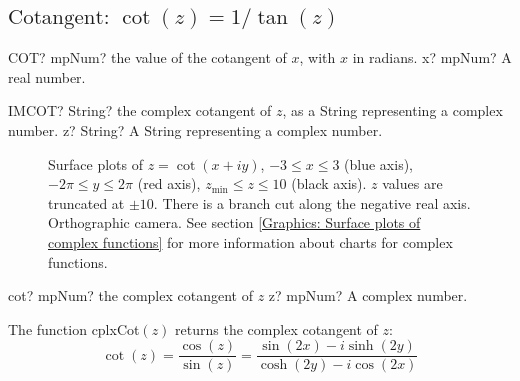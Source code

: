\newpage
\subsection{\texorpdfstring{$\text{Cotangent: }\cot(z) = 1/\tan(z)$}{cot}}

\begin{mpFunctionsExtract}
	\mpWorksheetFunctionOneNotImplemented
	{COT? mpNum? the value of the cotangent of $x$, with $x$ in radians.}
	{x? mpNum? A real number.}
\end{mpFunctionsExtract}

\vspace{0.6cm}
\begin{mpFunctionsExtract}
	\mpWorksheetFunctionOneNotImplemented
	{IMCOT? String? the complex cotangent of $z$, as a String representing a complex number.}
	{z? String? A String representing a complex number.}
\end{mpFunctionsExtract}


\begin{figure}[ht]%
	\centering
	\qquad
	\caption[Complex Cotangent]{Surface plots of $z = \cot(x + iy)$, $-3 \leq x \leq 3$ (blue axis), $-2 \pi \leq y \leq 2\pi$ (red axis), $z_{\text{min}} \leq z \leq 10$ (black axis). $z$ values are truncated at $\pm 10$. There is a branch cut along the negative real axis. Orthographic camera. See section \ref{Graphics: Surface plots of complex functions} for more information about charts for complex functions.} 
	\label{fig:Complex Cotangent}%
\end{figure}

\begin{mpFunctionsExtract}
	\mpFunctionOne
	{cot? mpNum? the complex cotangent of $z$}
	{z? mpNum? A complex number.}
\end{mpFunctionsExtract}

\vspace{0.3cm}
The function \textsf{cplxCot$(z)$} returns the complex cotangent of $z$: 
\begin{equation}
	\cot(z) =\frac{\cos(z)}{\sin(z)} = \frac{\sin(2x)-i \sinh(2y)}{\cosh(2y)-i \cos(2x)}
\end{equation}


